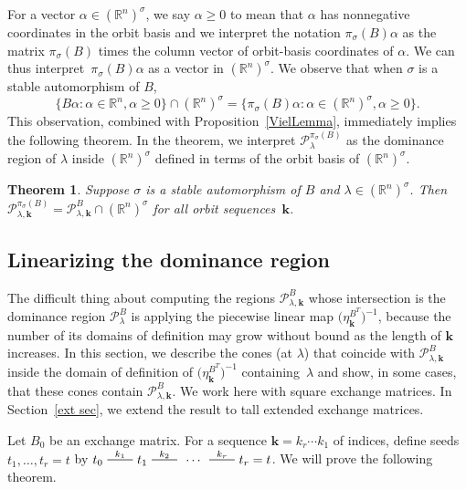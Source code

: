 \documentclass[10pt]{article}
\newtheorem{theorem}[proposition]{Theorem}
\theoremstyle{definition}
\theoremstyle{remark}
\numberwithin{equation}{section}
\newcommand{\reals}{\mathbb R}
\newcommand{\edge}{\,\,\rule[2.7pt]{20pt}{0.5pt}\,\,}
\newcommand{\sett}[1]{{\bigl\lbrace #1 \bigr\rbrace}}
\newcommand{\0}{{\mathbf{0}}}
\newcommand{\g}{\mathbf{g}}
\newcommand{\kk}{{\boldsymbol{k}}}
\renewcommand{\P}{\mathcal{P}}
\begin{document}
For a vector $\alpha\in(\reals^n)^\sigma$, we say $\alpha\ge0$ to mean that $\alpha$ has nonnegative coordinates in the orbit basis and we interpret the notation $\pi_\sigma(B)\alpha$ as the matrix $\pi_\sigma(B)$ times the column vector of orbit-basis coordinates of $\alpha$.
We can thus interpret~$\pi_\sigma(B)\alpha$ as a vector in $(\reals^n)^\sigma$.
We observe that when $\sigma$ is a stable automorphism of $B$,
\[\sett{B\alpha:\alpha\in\reals^n,\alpha\ge0}\cap(\reals^n)^\sigma=\sett{\pi_\sigma(B)\alpha:\alpha\in(\reals^n)^\sigma,\alpha\ge0}.\]
This observation, combined with Proposition~\ref{VielLemma}, immediately implies the following theorem.
In the theorem, we interpret $\P_\lambda^{\pi_\sigma(B)}$ as the dominance region of $\lambda$ inside $(\reals^n)^\sigma$ defined in terms of the orbit basis of $(\reals^n)^\sigma$.
\begin{theorem}\label{fold dom reg}
Suppose $\sigma$ is a stable automorphism of $B$ and $\lambda\in(\reals^n)^\sigma$.
Then~$\P_{\lambda,\kk}^{\pi_\sigma(B)}=\P_{\lambda,\kk}^B\cap(\reals^n)^\sigma$ for all orbit sequences~$\kk$.
\end{theorem}




\subsection{Linearizing the dominance region}\label{lin sec}
The difficult thing about computing the regions $\P^B_{\lambda,\kk}$ whose intersection is the dominance region $\P^B_\lambda$ is applying the piecewise linear map $\bigl(\eta^{B^T}_\kk\bigr)^{-1}$, because the number of its domains of definition may grow without bound as the length of $\kk$ increases.
In this section, we describe the cones (at $\lambda$) that coincide with $\P^B_{\lambda,\kk}$ inside the domain of definition of $\bigl(\eta^{B^T}_\kk\bigr)^{-1}$ containing~$\lambda$ and show, in some cases, that these cones contain $\P^B_{\lambda,\kk}$.
We work here with square exchange matrices.
In Section~\ref{ext sec}, we extend the result to tall extended exchange matrices.

Let $B_0$ be an exchange matrix.
For a sequence $\kk=k_r\cdots k_1$ of indices, define seeds $t_1,\ldots,t_r=t$ by $t_0\overset{k_1}{\edge}t_1\overset{k_2}{\edge}\,\cdots\,\overset{k_r}{\edge}t_r=t$.
We will prove the following theorem.
\end{document}
